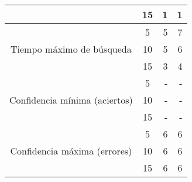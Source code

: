 \begin{sidewaystable}
\begin{tabular}{@{}ccc|rr@{}}
\multicolumn{2}{c}{}                                               & 15       & 1                            & 1                            \\
\midrule
\multicolumn{2}{c}{\multirow{3}{*}{Tiempo máximo de búsqueda}}     & 5        & 5                            & 7                            \\
\multicolumn{2}{c}{}                                               & 10       & 5                            & 6                            \\
\multicolumn{2}{c}{}                                               & 15       & 3                            & 4                            \\
\midrule
\multicolumn{2}{c}{\multirow{3}{*}{Confidencia mínima (aciertos)}} & 5        & -                            & -                            \\
\multicolumn{2}{c}{}                                               & 10       & -                            & -                            \\
\multicolumn{2}{c}{}                                               & 15       & -                            & -                            \\
\midrule
\multicolumn{2}{c}{\multirow{3}{*}{Confidencia máxima (errores)}}  & 5        & 6                            & 6                            \\
\multicolumn{2}{c}{}                                               & 10       & 6                            & 6                            \\
\multicolumn{2}{c}{}                                               & 15       & 6                            & 6                           
\\ \midrule \bottomrule 
\end{tabular}
\end{sidewaystable}